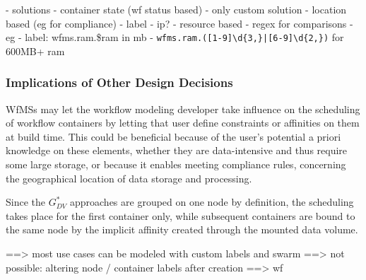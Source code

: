     - solutions
      - container state (wf status based)
        - only custom solution
      - location based (eg for compliance)
        - label
        - ip?
      - resource based
        - regex for comparisons
          - eg
            - label: wfms.ram.\$ram in mb
            - \texttt{wfms.ram.([1-9]{\textbackslash}d\{3,\}|[6-9]{\textbackslash}d\{2,\})} for 600MB+ ram




  \subsubsection{Implications of Other Design Decisions} %
  \label{ssub:implications_of_other_design_decisions}
    \acp{WfMS} may let the workflow modeling developer take influence on the scheduling of workflow containers by letting that user define constraints or affinities on them at build time. This could be beneficial because of the user's potential a priori knowledge on these elements, \eg whether they are data-intensive and thus require some large storage, or because it enables meeting compliance rules, \eg concerning the geographical location of data storage and processing.

    Since the $G_{DV}^{*}$ approaches are grouped on one node by definition, the scheduling takes place for the first container only, while subsequent containers are bound to the same node by the implicit affinity created through the mounted data volume.


==> most use cases can be modeled with custom labels and swarm
==> not possible: altering node / container labels after creation
==> wf


